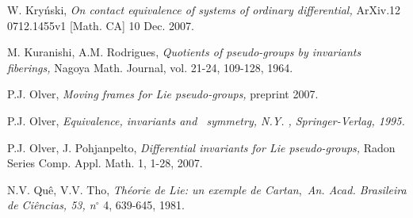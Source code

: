 \documentclass{amsproc}
\theoremstyle{remark}
\numberwithin{equation}{section}
\begin{document}
\begin{thebibliography}{99}
 W. Kry\'{n}ski, \textit{On contact equivalence of systems of
ordinary differential, }ArXiv.12 0712.1455v1 [Math. CA] 10 Dec. 2007.

 M. Kuranishi, A.M. Rodrigues, \textit{Quotients of pseudo-groups
by invariants fiberings, }Nagoya Math. Journal, vol. 21-24, 109-128, 1964.

 P.J. Olver, \textit{Moving frames for Lie pseudo-groups, }preprint 2007.

 P.J. Olver, \textit{Equivalence, invariants and \ symmetry, N.Y.
, Springer-Verlag, 1995.}

 P.J. Olver, J. Pohjanpelto, \textit{Differential invariants for
Lie pseudo-groups, }Radon Series Comp. Appl. Math. 1, 1-28, 2007.

 N.V. Qu\^{e}, V.V. Tho, \textit{Th\'{e}orie de Lie: un exemple de
Cartan},\textit{\ An. Acad. Brasileira de Ci\^{e}ncias, 53, n}${{}^\circ}$ 4, 
639-645, 1981.
\end{thebibliography}
\end{document}
